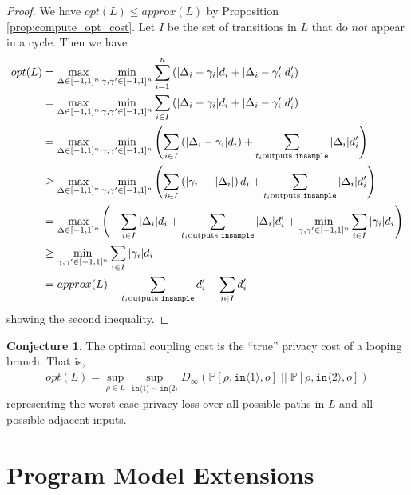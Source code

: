 \documentclass[12pt]{article}
\newcommand{\PP}{\mathbb{P}}
\newcommand{\brangle}[1]{\langle #1 \rangle}
\theoremstyle{definition}
\newtheorem{conj}[thm]{Conjecture}
\begin{document}
\begin{proof}
    We have $opt(L) \leq approx(L)$ by Proposition \ref{prop:compute_opt_cost}. Let $I$ be the set of transitions in $L$ that do $\textit{not}$ appear in a cycle. Then we have
    \begin{align*}
        opt(L) &= \max_{\Delta \in [-1, 1]^n} \min_{\gamma, \gamma' \in [-1, 1]^n} \sum_{i = 1}^n \left(|\Delta_i - \gamma_i| d_i + |\Delta_i - \gamma_i'|d_i' \right)\\
        &= \max_{\Delta \in [-1, 1]^n} \min_{\gamma, \gamma' \in [-1, 1]^n} \sum_{i \in I} \left(|\Delta_i - \gamma_i| d_i + |\Delta_i - \gamma_i'|d_i' \right)\\
        &= \max_{\Delta \in [-1, 1]^n} \min_{\gamma, \gamma' \in [-1, 1]^n} \left(\sum_{i \in I} \left(|\Delta_i - \gamma_i| d_i \right) + \sum_{t_i \text{outputs \texttt{insample}}} |\Delta_i| d_i' \right)\\
        &\geq \max_{\Delta \in [-1, 1]^n} \min_{\gamma, \gamma' \in [-1, 1]^n} \left(\sum_{i \in I} \left(|\gamma_i| - |\Delta_i| \right) d_i  + \sum_{t_i \text{outputs \texttt{insample}}} |\Delta_i| d_i' \right)\\
        &= \max_{\Delta \in [-1, 1]^n} \left(- \sum_{i \in I} |\Delta_i| d_i + \sum_{t_i \text{outputs \texttt{insample}}} |\Delta_i| d_i' + \min_{\gamma, \gamma' \in [-1, 1]^n} \sum_{i \in I}|\gamma_i| d_i \right)\\
        &\geq \min_{\gamma, \gamma' \in [-1, 1]^n} \sum_{i \in I}|\gamma_i| d_i \\
        &= approx(L) - \sum_{t_i \text{outputs \texttt{insample}}} d_i' - \sum_{i \in I} d_i'
    \end{align*}
    showing the second inequality.
\end{proof}


\begin{conj}
    The optimal coupling cost is the ``true'' privacy cost of a looping branch. That is, 
    \begin{align*}
        opt(L) = \sup_{\rho \in L} \sup_{\texttt{in}\brangle{1} \sim \texttt{in}\brangle{2}} D_\infty(\PP[\rho, \texttt{in}\brangle{1}, o]\; ||\; \PP[\rho, \texttt{in}\brangle{2}, o])
    \end{align*}
    representing the worst-case privacy loss over all possible paths in $L$ and all possible adjacent inputs.
\end{conj}

\section{Program Model Extensions}
\end{document}
